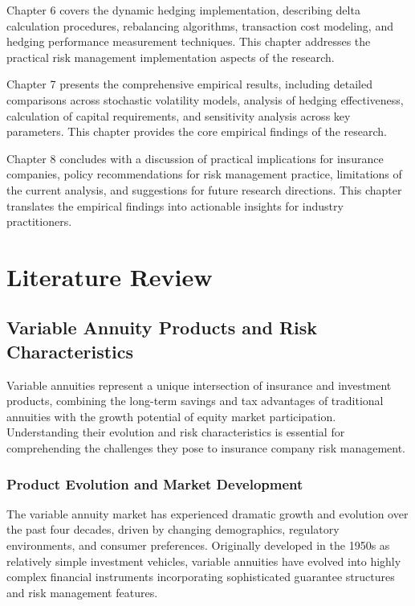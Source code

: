 \documentclass[12pt,a4paper]{report}
\begin{document}
Chapter 6 covers the dynamic hedging implementation, describing delta calculation procedures, rebalancing algorithms, transaction cost modeling, and hedging performance measurement techniques. This chapter addresses the practical risk management implementation aspects of the research.

Chapter 7 presents the comprehensive empirical results, including detailed comparisons across stochastic volatility models, analysis of hedging effectiveness, calculation of capital requirements, and sensitivity analysis across key parameters. This chapter provides the core empirical findings of the research.

Chapter 8 concludes with a discussion of practical implications for insurance companies, policy recommendations for risk management practice, limitations of the current analysis, and suggestions for future research directions. This chapter translates the empirical findings into actionable insights for industry practitioners.

\chapter{Literature Review}

\section{Variable Annuity Products and Risk Characteristics}

Variable annuities represent a unique intersection of insurance and investment products, combining the long-term savings and tax advantages of traditional annuities with the growth potential of equity market participation. Understanding their evolution and risk characteristics is essential for comprehending the challenges they pose to insurance company risk management.

\subsection{Product Evolution and Market Development}

The variable annuity market has experienced dramatic growth and evolution over the past four decades, driven by changing demographics, regulatory environments, and consumer preferences. Originally developed in the 1950s as relatively simple investment vehicles, variable annuities have evolved into highly complex financial instruments incorporating sophisticated guarantee structures and risk management features.
\end{document}
